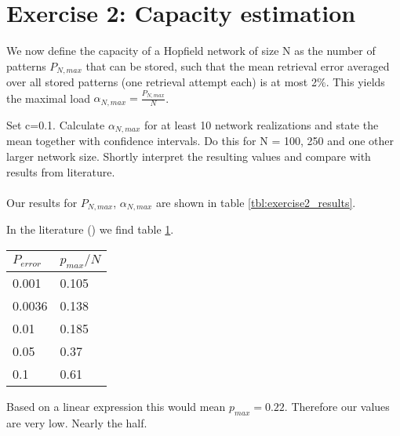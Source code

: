 \section{Exercise 2: Capacity estimation}

\begin{itshape}
\small
We now define the capacity of a Hopfield network of size N as the number of patterns $P_{N,max}$ that can be stored, such that the mean retrieval error averaged over all stored patterns (one retrieval attempt each) is at most 2$\%$. This yields the maximal load $\alpha_{N,max} = \frac{P_{N,max} }{N}$.

Set c=0.1. Calculate $\alpha_{N,max}$ for at least 10 network realizations and state the mean together with confidence intervals. Do this for N = 100, 250 and one other larger network size. Shortly interpret the resulting values and compare with results from literature.
\end{itshape}

\paragraph*{}

Our results for $P_{N,max}$, $\alpha_{N,max}$ are shown in table \ref{tbl:exercise2_results}.

\begin{table}[H] 
\centering 

\label{tbl:exercise2_results}
\end{table} 

In the literature (\citep{Hertz1991}) we find table \ref{tbl:exercise2_lit_value}.

\begin{table}[H] 
\centering 
\begin{tabular}{|l|l|}
\hline
$P_{error}$ & $p_{max}/N$ \\ \hline \hline
0.001 & 0.105 \\
0.0036 & 0.138 \\
0.01 & 0.185 \\
0.05 & 0.37 \\
0.1 & 0.61 \\
\hline
\end{tabular}
\label{tbl:exercise2_lit_value}
\end{table} 


Based on a linear expression this would mean $p_{max} = 0.22$. Therefore our values are very low. Nearly the half.